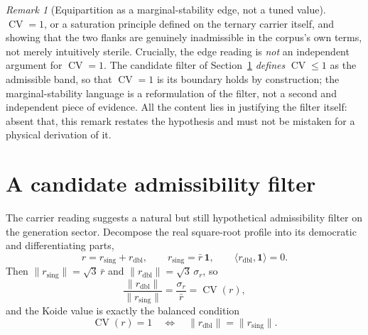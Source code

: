\documentclass[11pt]{article}
\theoremstyle{definition}
\theoremstyle{remark}
\newtheorem{remark}{Remark}
\newcommand{\CV}{\operatorname{CV}}
\begin{document}
\begin{remark}[Equipartition as a marginal-stability edge, not a tuned value]
      $\CV = 1$, or a saturation principle defined on the ternary carrier itself, and showing that the two flanks
      are genuinely inadmissible in the
      corpus's own terms, not merely intuitively sterile.
      Crucially, the edge reading is \emph{not} an independent argument for $\CV = 1$.
      The candidate filter of Section~\ref{sec:filter} \emph{defines} $\CV \le 1$ as the admissible band, so that
      $\CV = 1$ is its boundary holds by construction; the marginal-stability language is a reformulation of the
      filter, not a second and independent piece of evidence.
      All the content lies in justifying the filter itself: absent that, this remark restates the hypothesis and
      must not be mistaken for a physical derivation of it.
    \end{remark}

  \section{A candidate admissibility filter}
    \label{sec:filter}

    The carrier reading suggests a natural but still hypothetical admissibility filter on the generation sector.
    Decompose the real square-root profile into its democratic and differentiating parts,
    \begin{equation}
      \label{eq:decomp}
      r = r_{\mathrm{sing}} + r_{\mathrm{dbl}},
      \qquad r_{\mathrm{sing}} = \bar r\,\mathbf 1,
      \qquad \langle r_{\mathrm{dbl}}, \mathbf 1 \rangle = 0 .
    \end{equation}
    Then $\lVert r_{\mathrm{sing}} \rVert = \sqrt3\,\bar r$ and $\lVert r_{\mathrm{dbl}} \rVert = \sqrt3\,\sigma_r$, so
    \begin{equation}
      \label{eq:ratio}
      \frac{\lVert r_{\mathrm{dbl}} \rVert}{\lVert r_{\mathrm{sing}} \rVert} = \frac{\sigma_r}{\bar r} = \CV(r),
    \end{equation}
    and the Koide value is exactly the balanced condition
    \begin{equation}
      \label{eq:balanced}
      \CV(r) = 1 \quad\Longleftrightarrow\quad \lVert r_{\mathrm{dbl}} \rVert = \lVert r_{\mathrm{sing}} \rVert .
    \end{equation}
\end{document}
